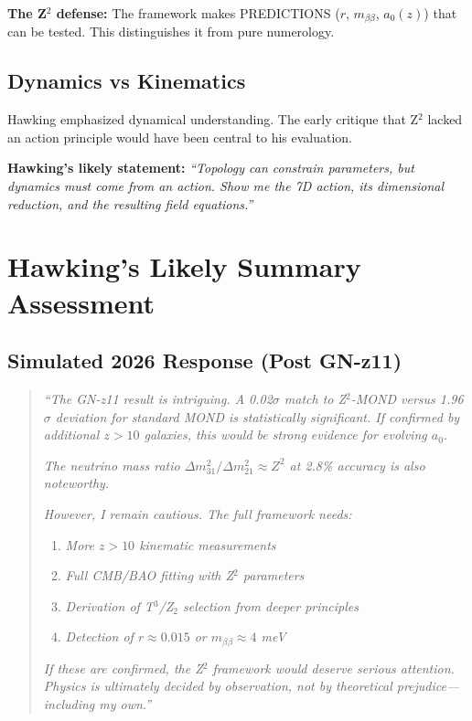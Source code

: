 \documentclass[12pt,a4paper]{article}
\begin{document}
\textbf{The Z$^2$ defense:} The framework makes PREDICTIONS ($r$, $m_{\beta\beta}$, $a_0(z)$) that can be tested. This distinguishes it from pure numerology.

\subsection{Dynamics vs Kinematics}

Hawking emphasized dynamical understanding. The early critique that Z$^2$ lacked an action principle would have been central to his evaluation.

\textbf{Hawking's likely statement:} \textit{``Topology can constrain parameters, but dynamics must come from an action. Show me the 7D action, its dimensional reduction, and the resulting field equations.''}

\section{Hawking's Likely Summary Assessment}

\subsection{Simulated 2026 Response (Post GN-z11)}

\begin{quote}
\textit{``The GN-z11 result is intriguing. A 0.02$\sigma$ match to Z$^2$-MOND versus 1.96$\sigma$ deviation for standard MOND is statistically significant. If confirmed by additional $z > 10$ galaxies, this would be strong evidence for evolving $a_0$.}

\textit{The neutrino mass ratio $\Delta m^2_{31}/\Delta m^2_{21} \approx Z^2$ at 2.8\% accuracy is also noteworthy.}

\textit{However, I remain cautious. The full framework needs:}
\begin{enumerate}
\item \textit{More $z > 10$ kinematic measurements}
\item \textit{Full CMB/BAO fitting with Z$^2$ parameters}
\item \textit{Derivation of T$^3$/Z$_2$ selection from deeper principles}
\item \textit{Detection of $r \approx 0.015$ or $m_{\beta\beta} \approx 4$ meV}
\end{enumerate}

\textit{If these are confirmed, the Z$^2$ framework would deserve serious attention. Physics is ultimately decided by observation, not by theoretical prejudice---including my own.''}
\end{quote}
\end{document}
